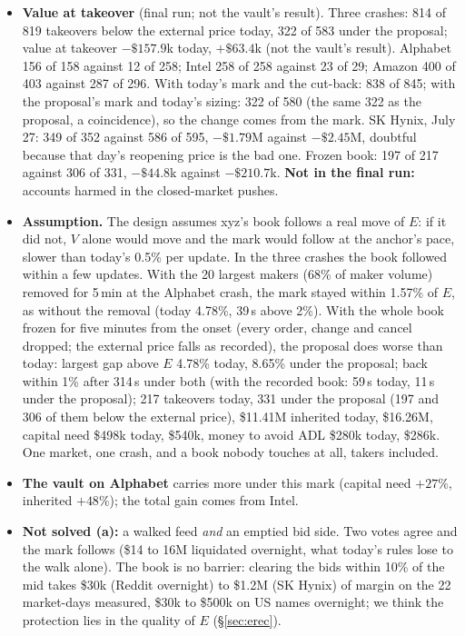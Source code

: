 \documentclass[10.5pt,a4paper]{article}
\begin{document}
{\begin{itemize}[leftmargin=1.2em,itemsep=.2ex,topsep=.3ex]
\item \textbf{Value at takeover} (final run; not the vault's result). Three crashes: 814 of 819 takeovers below the external price today, 322 of 583 under the proposal; value at takeover $-\$157.9$k today, $+\$63.4$k (not the vault's result). Alphabet 156 of 158 against 12 of 258; Intel 258 of 258 against 23 of 29; Amazon 400 of 403 against 287 of 296. With today's mark and the cut-back: 838 of 845; with the proposal's mark and today's sizing: 322 of 580 (the same 322 as the proposal, a coincidence), so the change comes from the mark. SK Hynix, July 27: 349 of 352 against 586 of 595, $-\$1.79$M against $-\$2.45$M, doubtful because that day's reopening price is the bad one. Frozen book: 197 of 217 against 306 of 331, $-\$44.8$k against $-\$210.7$k. \textbf{Not in the final run:} accounts harmed in the closed-market pushes.
\item \textbf{Assumption.} The design assumes xyz's book follows a real move of $E$: if it did not, $V$ alone would move and the mark would follow at the anchor's pace, slower than today's 0.5\% per update. In the three crashes the book followed within a few updates. With the 20 largest makers (68\% of maker volume) removed for 5\,min at the Alphabet crash, the mark stayed within 1.57\% of $E$, as without the removal (today 4.78\%, 39\,s above 2\%). With the whole book frozen for five minutes from the onset (every order, change and cancel dropped; the external price falls as recorded), the proposal does worse than today: largest gap above $E$ 4.78\% today, 8.65\% under the proposal; back within 1\% after 314\,s under both (with the recorded book: 59\,s today, 11\,s under the proposal); 217 takeovers today, 331 under the proposal (197 and 306 of them below the external price), \$11.41M inherited today, \$16.26M, capital need \$498k today, \$540k, money to avoid ADL \$280k today, \$286k. One market, one crash, and a book nobody touches at all, takers included.
\item \textbf{The vault on Alphabet} carries more under this mark (capital need $+27\%$, inherited $+48\%$); the total gain comes from Intel.
\item \textbf{Not solved (a):} a walked feed \emph{and} an emptied bid side. Two votes agree and the mark follows (\$14 to 16M liquidated overnight, what today's rules lose to the walk alone). The book is no barrier: clearing the bids within 10\% of the mid takes \$30k (Reddit overnight) to \$1.2M (SK Hynix) of margin on the 22 market-days measured, \$30k to \$500k on US names overnight; we think the protection lies in the quality of $E$ (\S\ref{sec:erec}).

\end{itemize}}
\end{document}

